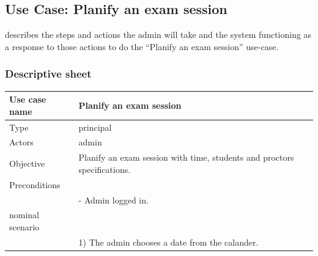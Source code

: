 \documentclass[]{uc2pfecaneva}
\begin{document}
    \begin{table}[t]
        \raggedright\subsection{Use Case: Planify an exam session}
        describes the steps and actions the admin will take and the system functioning as a response to
        those actions to do the “Planify an exam session” use-case.
        \subsubsection{Descriptive sheet}
        \centering
        \begin{tabularx}{\textwidth}{|l|X|}
            \hline
            Use case name         & Planify an exam session                                                                                                                                            \\ \hline
            Type                  & principal                                                                                                                                                         \\ \hline
            Actors                & admin                                                                                                                                                             \\ \hline
            Objective             & Planify an exam session with time, students and proctors specifications.                                                                                           \\ \hline
            Preconditions         &                                                                                                                                                                   \\
            & - Admin logged in.                                                                                                                                                \\\hline
            nominal scenario      &                                                                                                                                                                   \\
            & 1) The admin chooses a date from the calander.                                                                                                           \\

\end{tabularx}
\end{table}
\end{document}
